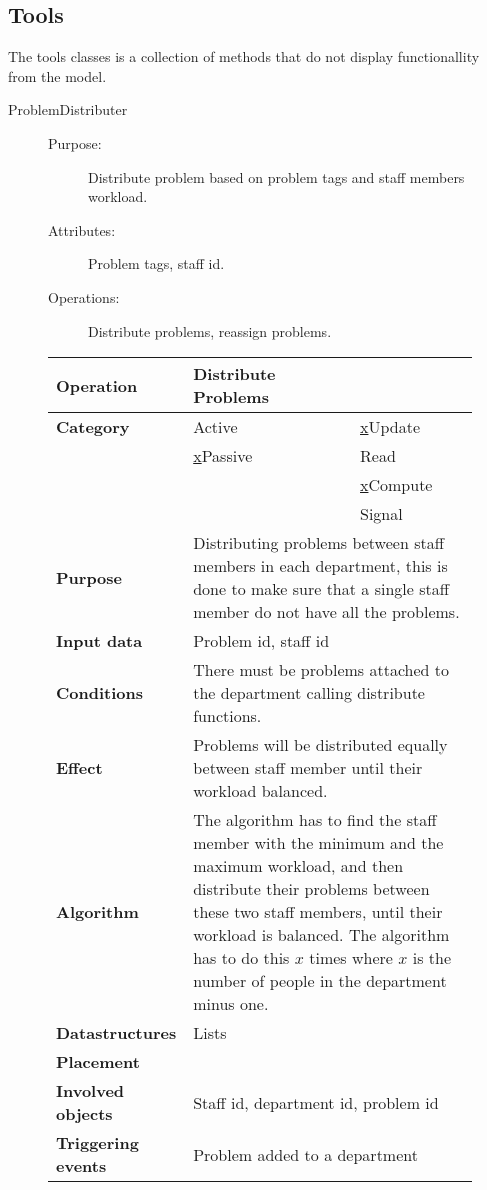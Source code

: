 \subsection{Tools}

The tools classes is a collection of methods that do not display functionallity from the model.

\begin{description}
\item[ProblemDistributer]\hfill
\begin{description}
\item[Purpose:]Distribute problem based on problem tags and staff members workload.
\item[Attributes:]Problem tags, staff id.
\item[Operations:]Distribute problems, reassign problems.
\end{description}
\end{description}

\begin{figure}
\begin{tabular}{p{3.5cm} p{4cm} p{4cm}}
\hline
\textbf{Operation}&Distribute Problems\\
\hline
\textbf{Category}&\underline{ }Active&\underline{x}Update\\
&\underline{x}Passive&\underline{ }Read\\
&&\underline{x}Compute\\
&&\underline{ }Signal\\
\textbf{Purpose}&\multicolumn{2}{p{8cm}}{Distributing problems between staff members in each department, this is done to make sure that a single staff member do not have all the problems.}\\
\textbf{Input data}&\multicolumn{2}{p{8cm}}{Problem id, staff id}\\
\textbf{Conditions}&\multicolumn{2}{p{8cm}}{There must be problems attached to the department calling distribute functions.}\\
\textbf{Effect}&\multicolumn{2}{p{8cm}}{Problems will be distributed equally between staff member until their workload balanced.}\\
\textbf{Algorithm}&\multicolumn{2}{p{8cm}}{The algorithm has to find the staff member with the minimum and the maximum workload, and then distribute their problems between these two staff members, until their workload is balanced. The algorithm has to do this $x$ times where $x$ is the number of people in the department minus one.}\\
\textbf{Datastructures}&\multicolumn{2}{p{8cm}}{Lists}\\
\textbf{Placement}&\multicolumn{2}{p{8cm}}{}\\
\textbf{Involved objects}&\multicolumn{2}{p{8cm}}{Staff id, department id, problem id}\\
\textbf{Triggering events}&\multicolumn{2}{p{8cm}}{Problem added to a department}\\
\hline
\end{tabular}
\end{figure}

